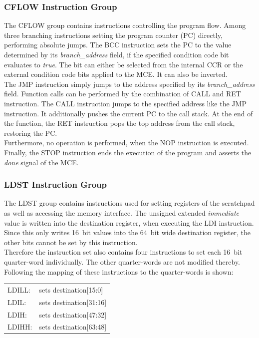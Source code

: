 \subsubsection{CFLOW Instruction Group}

The CFLOW group contains instructions controlling the program flow.
Among three branching instructions setting the program counter (PC) directly, performing absolute jumps.
The BCC instruction sets the PC to the value determined by its \emph{branch\_address} field, if the specified condition code bit evaluates to \emph{true}.
The bit can either be selected from the internal CCR or the external condition code bits applied to the MCE.
It can also be inverted.\\
The JMP instruction simply jumps to the address specified by its \emph{branch\_address} field.
Function calls can be performed by the combination of CALL and RET instruction.
The CALL instruction jumps to the specified address like the JMP instruction.
It additionally pushes the current PC to the call stack.
At the end of the function, the RET instruction pops the top address from the call stack, restoring the PC.\\
Furthermore, no operation is performed, when the NOP instruction is executed.
Finally, the STOP instruction ends the execution of the program and asserts the \emph{done} signal of the MCE.

\subsubsection{LDST Instruction Group}

The LDST group contains instructions used for setting registers of the scratchpad as well as accessing the memory interface.
The unsigned extended \emph{immediate} value is written into the destination register, when executing the LDI instruction.
Since this only writes 16~bit values into the 64~bit wide destination register, the other bits cannot be set by this instruction.\\
Therefore the instruction set also contains four instructions to set each 16~bit quarter-word individually.
The other quarter-words are not modified thereby.
Following the mapping of these instructions to the quarter-words is shown:\\

\begin{tabular}{l l}
    LDILL: & sets destination[15:0]  \\
    LDIL:  & sets destination[31:16] \\
    LDIH:  & sets destination[47:32] \\
    LDIHH: & sets destination[63:48] \\
\end{tabular}


